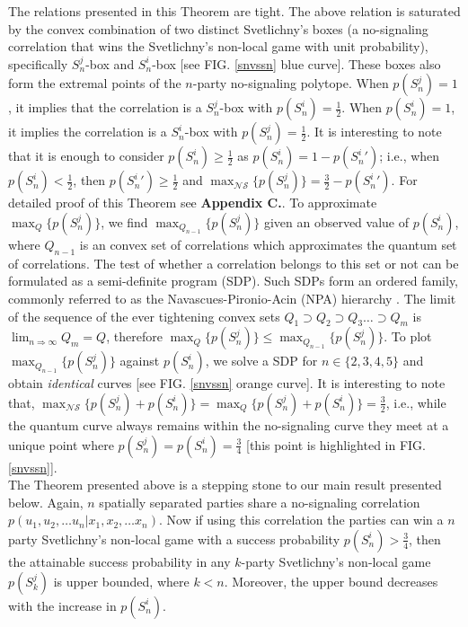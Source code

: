 \documentclass[%
 reprint,
 amsmath,amssymb,
 aps,
]{revtex4-1}
\theoremstyle{plain}
\begin{document}
The relations presented in this Theorem are tight. The above relation is saturated by the convex combination of two distinct Svetlichny's boxes (a no-signaling correlation that wins the Svetlichny's non-local game with unit probability), specifically $S_n^j$-box and $S_n^i$-box [see FIG. \ref{snvssn} blue curve]. These boxes also form the extremal points of the $n$-party no-signaling polytope. When $p(S^j_n)=1$, it implies that the correlation is a $S_n^j$-box with $p(S_n^i)=\frac{1}{2}$. When $p(S^i_n)=1$, it implies the correlation is a $S_n^i$-box with $p(S_n^j)=\frac{1}{2}$. It is interesting to note that it is enough to consider $p(S_n^i)\ge \frac{1}{2}$ as $p(S_n^i)=1-p({S_n^i}')$; i.e., when $p(S_n^i) < \frac{1}{2}$, then $p({S_n^i}')\ge \frac{1}{2}$ and $\max_{\mathcal{NS}}\{p(S_n^j)\}=\frac{3}{2}-p({S_n^i}')$.
For detailed proof of this Theorem see \textbf{Appendix C.}.
To approximate $\max_{Q} \{p({S_n^j})\}$, we find $\max_{Q_{n-1}} \{p({S_n^j})\}$ given an observed value of $p(S_n^i)$, where $Q_{n-1}$ is an convex set of correlations which approximates the quantum set of correlations. The test of whether a correlation belongs to this set or not can be formulated as a semi-definite program (SDP). Such SDPs form an ordered family, commonly referred to as the Navascues-Pironio-Acin (NPA) hierarchy \cite{navascues2008convergent,wehner2006tsirelson,vandenberghe1996semidefinite,liang2007bounds,doherty2008quantum}. The limit of the sequence of the ever tightening convex sets $Q_1 \supset Q_2 \supset Q_3 \ldots \supset Q_{m}$ is $\lim_{ n \Rightarrow \infty}Q_m=Q$, therefore $\max_{Q} \{p({S_n^j})\} \le \max_{Q_{n-1}} \{p({S_n^j})\}$. To plot
 $\max_{Q_{n-1}} \{p({S_n^j})\}$ against $p({S_n^i})$, we solve a SDP for $n\in \{2,3,4,5\}$ and obtain \textit{identical} curves [see FIG. \ref{snvssn} orange curve]. It is interesting to note that, $\max_{\mathcal{NS}}\{p(S_n^j)+p(S_n^i)\}=\max_{Q}\{p(S_n^j)+p(S_n^i)\}=\frac{3}{2}$, i.e., while the quantum curve always remains within the no-signaling curve they meet at a unique point where $p(S_n^j)=p(S_n^i)=\frac{3}{4}$ [this point is highlighted in FIG. \ref{snvssn}].\\
The Theorem presented above is a stepping stone to our main result presented below. Again, $n$ spatially separated parties share a no-signaling correlation $p(u_1,u_2,\ldots u_n|x_1,x_2,\ldots x_n)$. Now if using this correlation the parties can win a $n$ party Svetlichny's non-local game with a success probability $p(S_n^i)>\frac{3}{4}$, then the attainable success probability in any $k$-party Svetlichny's non-local game $p(S_k^j)$ is upper bounded, where $k<n$. Moreover, the upper bound decreases with the increase in $p(S_n^i)$.
\end{document}
